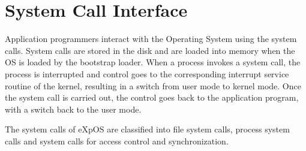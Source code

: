 \chapter{System Call Interface}
\label{chap7}
Application programmers interact with the Operating System using the system calls. System calls are stored in the disk and are loaded into memory when the OS is loaded by the bootstrap loader. When a process invokes a system call, the process is interrupted and control goes to the corresponding interrupt service routine of the kernel, resulting in a switch from user mode to kernel mode. Once the system call is carried out, the control goes back to the application program, with a switch back to the user mode.

The system calls of eXpOS are classified into file system calls, process system calls and system calls for access control and synchronization.

